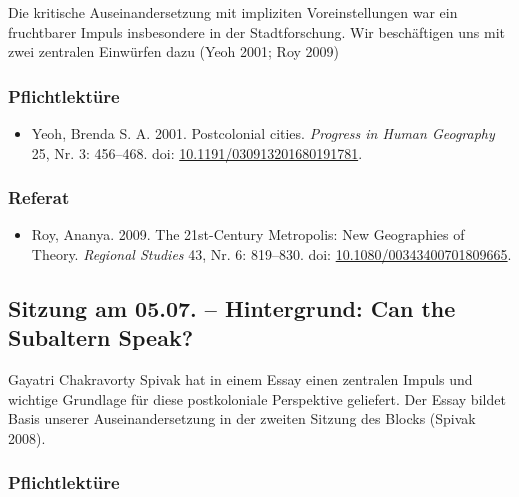 \documentclass[
  ngerman,
]{article}
\providecommand{\tightlist}{%
  \setlength{\itemsep}{0pt}\setlength{\parskip}{0pt}}
\begin{document}
Die kritische Auseinandersetzung mit impliziten Voreinstellungen war ein fruchtbarer Impuls insbesondere in der Stadtforschung. Wir beschäftigen uns mit zwei zentralen Einwürfen dazu (Yeoh 2001; Roy 2009)

\hypertarget{pflichtlektuxfcre-9}{%
\subsubsection*{Pflichtlektüre}\label{pflichtlektuxfcre-9}}

\begin{itemize}
\tightlist
\item
  Yeoh, Brenda S. A. 2001. Postcolonial cities. \emph{Progress in Human Geography} 25, Nr. 3: 456--468. doi: \href{https://doi.org/10.1191/030913201680191781}{10.1191/030913201680191781}.
\end{itemize}

\hypertarget{referat-9}{%
\subsubsection*{Referat}\label{referat-9}}

\begin{itemize}
\tightlist
\item
  Roy, Ananya. 2009. The 21st-Century Metropolis: New Geographies of Theory. \emph{Regional Studies} 43, Nr. 6: 819--830. doi: \href{https://doi.org/10.1080/00343400701809665}{10.1080/00343400701809665}.
\end{itemize}

\hypertarget{sitzung-am-05.07.-hintergrund-can-the-subaltern-speak}{%
\subsection{Sitzung am 05.07. -- Hintergrund: Can the Subaltern Speak?}\label{sitzung-am-05.07.-hintergrund-can-the-subaltern-speak}}

Gayatri Chakravorty Spivak hat in einem Essay einen zentralen Impuls und wichtige Grundlage für diese postkoloniale Perspektive geliefert. Der Essay bildet Basis unserer Auseinandersetzung in der zweiten Sitzung des Blocks (Spivak 2008).

\hypertarget{pflichtlektuxfcre-10}{%
\subsubsection*{Pflichtlektüre}\label{pflichtlektuxfcre-10}}
\end{document}
